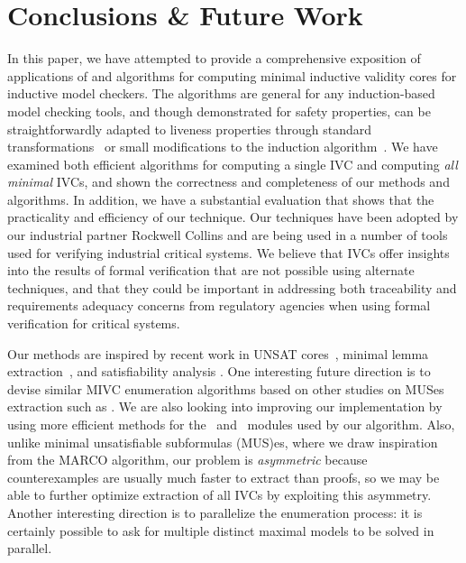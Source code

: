 \section{Conclusions \& Future Work}
\label{sec:conc}
In this paper, we have attempted to provide a comprehensive exposition of applications of and algorithms for computing minimal inductive validity cores for inductive model checkers.  The algorithms are general for any induction-based model checking tools, and though demonstrated for safety properties, can be straightforwardly adapted to liveness properties through standard transformations~\cite{Schuppan:2006} or small modifications to the induction algorithm~\cite{conf/fmcad/ClaessenS12}.
We have examined both efficient algorithms for computing a single IVC and computing {\em all minimal} IVCs, and shown
the correctness and completeness of our methods and algorithms.  In addition, we have a substantial evaluation that shows that the practicality and efficiency of our technique.
%
Our techniques have been adopted by our industrial partner Rockwell Collins and are being used in a number of tools used for verifying industrial critical systems.  We believe that IVCs offer insights into the results of formal verification that are not possible using alternate techniques, and that they could be important in addressing both traceability and requirements adequacy concerns from regulatory agencies when using formal verification for critical systems.

Our methods are inspired by recent work in UNSAT cores~\cite{zhang2003extracting}, minimal lemma extraction~\cite{piskac2016}, and satisfiability analysis \cite{marco2016fast}. One interesting future direction is to devise similar MIVC enumeration algorithms based on other studies on MUSes extraction such as \cite{nadel2014accelerated}.  We are also looking into improving our implementation by using more  efficient methods for the \isadeq ~and \getivc ~modules used by our algorithm.  Also, unlike minimal unsatisfiable subformulas (MUS)es, where we draw inspiration from the MARCO algorithm, our problem is {\em asymmetric} because counterexamples are usually much faster to extract than proofs, so we may be able to further optimize extraction of all IVCs by exploiting this asymmetry.  Another interesting direction is to parallelize the enumeration process: it is certainly possible to ask for multiple distinct maximal models to be solved in parallel.

